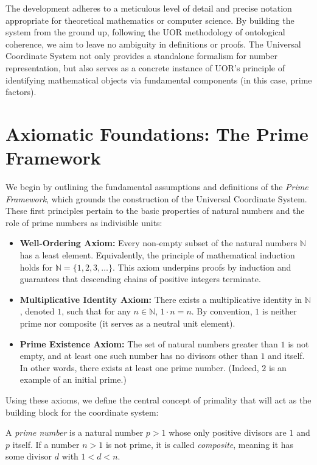 \documentclass[11pt]{article}
\begin{document}
The development adheres to a meticulous level of detail and precise notation appropriate for theoretical mathematics or computer science. By building the system from the ground up, following the UOR methodology of ontological coherence, we aim to leave no ambiguity in definitions or proofs. The Universal Coordinate System not only provides a standalone formalism for number representation, but also serves as a concrete instance of UOR's principle of identifying mathematical objects via fundamental components (in this case, prime factors).

\section{Axiomatic Foundations: The Prime Framework}

We begin by outlining the fundamental assumptions and definitions of the \textit{Prime Framework}, which grounds the construction of the Universal Coordinate System. These first principles pertain to the basic properties of natural numbers and the role of prime numbers as indivisible units:

\begin{itemize}[label={\bf Axiom \arabic*:}, leftmargin=3em]
 \item \textbf{Well-Ordering Axiom:} Every non-empty subset of the natural numbers $\mathbb{N}$ has a least element. Equivalently, the principle of mathematical induction holds for $\mathbb{N} = \{1,2,3,\dots\}$. This axiom underpins proofs by induction and guarantees that descending chains of positive integers terminate.
 \item \textbf{Multiplicative Identity Axiom:} There exists a multiplicative identity in $\mathbb{N}$, denoted $1$, such that for any $n \in \mathbb{N}$, $1 \cdot n = n$. By convention, $1$ is neither prime nor composite (it serves as a neutral unit element).
 \item \textbf{Prime Existence Axiom:} The set of natural numbers greater than $1$ is not empty, and at least one such number has no divisors other than $1$ and itself. In other words, there exists at least one prime number. (Indeed, $2$ is an example of an initial prime.)
\end{itemize}

Using these axioms, we define the central concept of primality that will act as the building block for the coordinate system:

\begin{definition}\label{def:prime}
A \emph{prime number} is a natural number $p > 1$ whose only positive divisors are $1$ and $p$ itself. If a number $n > 1$ is not prime, it is called \emph{composite}, meaning it has some divisor $d$ with $1 < d < n$. 
\end{definition}
\end{document}
